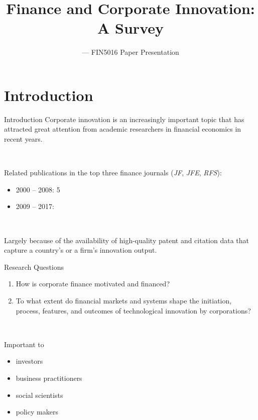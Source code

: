 \documentclass{beamer}
\title{Finance and Corporate Innovation: A Survey}
\subtitle{--- FIN5016 Paper Presentation}
\institute{Group 10}
\author[FIN5016]{%
  \texorpdfstring{%
    \begin{columns}
      \column{.33\linewidth}
      \centering
      Chen Jiangrui\\
      12231319
      \column{.33\linewidth}
      \centering
      Li Dacheng\\
      12232959
      \column{.33\linewidth}
      \centering
      Li Huang\\
      12132978
    \end{columns}
  }{Chen Jiangrui \and Li Dacheng \and Li Huang}
}
\begin{document}
    \begin{frame}
        \titlepage
    \end{frame}

    \begin{frame}
        \tableofcontents
    \end{frame}

    \section{Introduction}

    \begin{frame}{Introduction}
        Corporate innovation is an increasingly important topic that has attracted great attention from academic researchers in financial economics in recent years.

        ~

        Related publications in the top three finance journals (\textit{JF}, \textit{JFE}, \textit{RFS}):
        \begin{itemize}
            \item 2000 -- 2008: 5
            \item 2009 -- 2017: \color{sustechorange}{56}
        \end{itemize}

        ~

        Largely because of the availability of high-quality patent and citation data that capture a country's or a firm's innovation output.
    \end{frame}

    \begin{frame}{Research Questions}
        \begin{enumerate}
            \item How is corporate finance motivated and financed?
            \item To what extent do financial markets and systems shape the initiation, process, features, and outcomes of technological innovation by corporations?
        \end{enumerate}

        ~

        Important to
        \begin{itemize}
            \item investors
            \item business practitioners
            \item social scientists
            \item policy makers
        \end{itemize}
    \end{frame}
\end{document}
